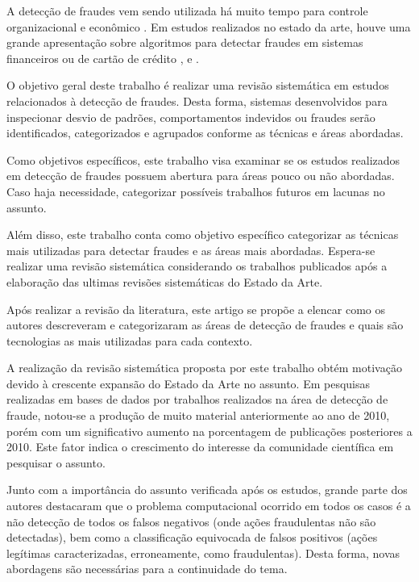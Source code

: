 \documentclass[smallextended]{svjour3}
\begin{document}
A detecção de fraudes vem sendo utilizada há muito tempo para controle organizacional e econômico \citep{Seyedhossein2010}. Em estudos realizados no estado da arte, houve uma grande apresentação sobre algoritmos para detectar fraudes em sistemas financeiros ou de cartão de crédito \citep{809570}, \citep{Chandola:2009:ADS:1541880.1541882} e \citep{Abdallah201690}.

O objetivo geral deste trabalho é realizar uma revisão sistemática em estudos relacionados à detecção de fraudes. Desta forma, sistemas desenvolvidos para inspecionar desvio de padrões, comportamentos indevidos ou fraudes serão identificados, categorizados e agrupados conforme as técnicas e áreas abordadas.

Como objetivos específicos, este trabalho visa examinar se os estudos realizados em detecção de fraudes possuem abertura para áreas pouco ou não abordadas. Caso haja necessidade, categorizar possíveis trabalhos futuros em lacunas no assunto.

Além disso, este trabalho conta como objetivo específico categorizar as técnicas mais utilizadas para detectar fraudes e as áreas mais abordadas. Espera-se realizar uma revisão sistemática considerando os trabalhos publicados após a elaboração das ultimas revisões sistemáticas do Estado da Arte.

Após realizar a revisão da literatura, este artigo se propõe a elencar como os autores descreveram e categorizaram as áreas de detecção de fraudes e quais são tecnologias as mais utilizadas para cada contexto.


A realização da revisão sistemática proposta por este trabalho obtém motivação devido à crescente expansão do Estado da Arte no assunto. Em pesquisas realizadas em bases de dados por trabalhos realizados na área de detecção de fraude, notou-se a produção de muito material anteriormente ao ano de 2010, porém com um significativo aumento na porcentagem de publicações posteriores a 2010. Este fator indica o crescimento do interesse da comunidade científica em pesquisar o assunto.

Junto com a importância do assunto verificada após os estudos, grande parte dos autores destacaram que o problema computacional ocorrido em todos os casos é a não detecção de todos os falsos negativos (onde ações fraudulentas não são detectadas), bem como a classificação equivocada de falsos positivos (ações legítimas caracterizadas, erroneamente, como fraudulentas). Desta forma, novas abordagens são necessárias para a continuidade do tema.
\end{document}
